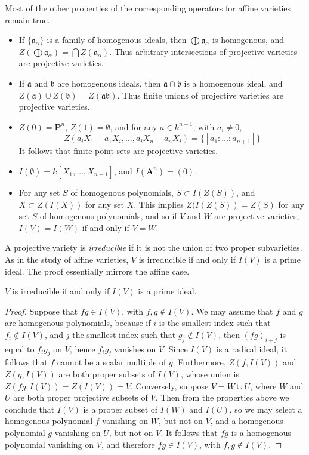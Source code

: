 Most of the other properties of the corresponding operators for affine varieties remain true.
%
\begin{itemize}
    \item If $\{ \mathfrak{a}_\alpha \}$ is a family of homogenous ideals, then $\bigoplus \mathfrak{a}_\alpha$ is homogenous, and $Z(\bigoplus \mathfrak{a}_\alpha) = \bigcap Z(\mathfrak{a}_\alpha)$. Thus arbitrary intersections of projective varieties are projective varieties.

    \item If $\mathfrak{a}$ and $\mathfrak{b}$ are homogenous ideals, then $\mathfrak{a} \cap \mathfrak{b}$ is a homogenous ideal, and $Z(\mathfrak{a}) \cup Z(\mathfrak{b}) = Z(\mathfrak{a}\mathfrak{b})$. Thus finite unions of projective varieties are projective varieties.

    \item $Z(0) = \mathbf{P}^n$, $Z(1) = \emptyset$, and for any $a \in k^{n+1}$, with $a_i \neq 0$,
    \[ Z(a_iX_1 - a_1X_i, \dots, a_iX_n - a_nX_i) = \{ [a_1:\dots:a_{n+1}] \} \]
    It follows that finite point sets are projective varieties.

    \item $I(\emptyset) = k[X_1, \dots, X_{n+1}]$, and $I(\mathbf{A}^n) = (0)$.

    \item For any set $S$ of homogenous polynomials, $S \subset I(Z(S))$, and $X \subset Z(I(X))$ for any set $X$. This implies $Z(I(Z(S)) = Z(S)$ for any set $S$ of homogenous polynomials, and so if $V$ and $W$ are projective varieties, $I(V) = I(W)$ if and only if $V = W$.
\end{itemize}

A projective variety is \emph{irreducible} if it is not the union of two proper subvarieties. As in the study of affine varieties, $V$ is irreducible if and only if $I(V)$ is a prime ideal. The proof essentially mirrors the affine case.

\begin{theorem}
    $V$ is irreducible if and only if $I(V)$ is a prime ideal.
\end{theorem}
\begin{proof}
    Suppose that $fg \in I(V)$, with $f,g \not \in I(V)$. We may assume that $f$ and $g$ are homogenous polynomials, because if $i$ is the smallest index such that $f_i \not \in I(V)$, and $j$ the smallest index such that $g_j \not \in I(V)$, then $(fg)_{i + j}$ is equal to $f_ig_j$ on $V$, hence $f_ig_j$ vanishes on $V$. Since $I(V)$ is a radical ideal, it follows that $f$ cannot be a scalar multiple of $g$. Furthermore, $Z(f,I(V))$ and $Z(g,I(V))$ are both proper subsets of $I(V)$, whose union is $Z(fg,I(V)) = Z(I(V)) = V$. Conversely, suppose $V = W \cup U$, where $W$ and $U$ are both proper projective subsets of $V$. Then from the properties above we conclude that $I(V)$ is a proper subset of $I(W)$ and $I(U)$, so we may select a homogenous polynomial $f$ vanishing on $W$, but not on $V$, and a homogenous polynomial $g$ vanishing on $U$, but not on $V$. It follows that $fg$ is a homogenous polynomial vanishing on $V$, and therefore $fg \in I(V)$, with $f,g \not \in I(V)$.
\end{proof}

